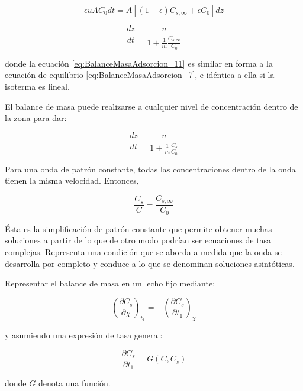 \documentclass[11pt]{book}
\begin{document}
\begin{equation*}
    \epsilon u A C_0 dt = A [ (1-\epsilon) C_{s, \infty} + \epsilon C_0 ] dz
\end{equation*}

\begin{equation}
    \label{eq:BalanceMasaAdsorcion_11}
    \frac{dz}{dt} = \frac{u}{1 + \frac{1}{m} \frac{C_{s, \infty}}{C_0}}
\end{equation}

donde la ecuación \ref{eq:BalanceMasaAdsorcion_11} es similar en forma a la ecuación de equilibrio \ref{eq:BalanceMasaAdsorcion_7}, e idéntica a ella si la isoterma es lineal.

El balance de masa puede realizarse a cualquier nivel de concentración dentro de la zona para dar:

\begin{equation}
    \label{eq:BalanceMasaAdsorcion_12}
    \frac{dz}{dt} = \frac{u}{1 + \frac{1}{m} \frac{C_s}{C_0}}
\end{equation}

Para una onda de patrón constante, todas las concentraciones dentro de la onda tienen la misma velocidad. Entonces,

\begin{equation}
    \label{eq:BalanceMasaAdsorcion_13}
    \frac{C_s}{C} = \frac{C_{s, \infty}}{C_0}
\end{equation}

Ésta es la simplificación de patrón constante que permite obtener muchas soluciones a partir de lo que de otro modo podrían ser ecuaciones de tasa complejas. Representa una condición que se aborda a medida que la onda se desarrolla por completo y conduce a lo que se denominan soluciones asintóticas.

Representar el balance de masa en un lecho fijo mediante:

\begin{equation*}
    \left( \frac{\partial C_s}{\partial \chi} \right)_{t_1} = - \left( \frac{\partial C_s}{\partial t_1} \right)_\chi
\end{equation*}

y asumiendo una expresión de tasa general:

\begin{equation}
    \label{eq:BalanceMasaAdsorcion_14}
    \frac{\partial C_s}{\partial t_1} = G(C, C_s)
\end{equation}

donde $G$ denota una función.
\end{document}

